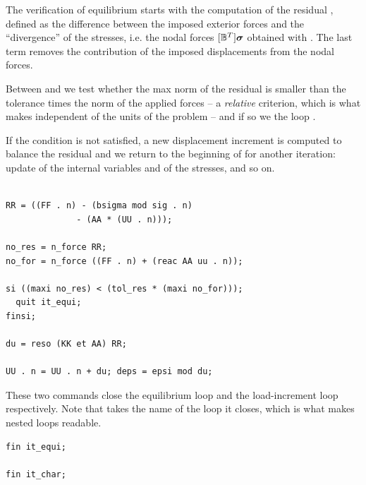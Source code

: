 \begin{castemcom}
The verification of equilibrium starts with the computation of the residual
, defined as the difference between the imposed exterior forces
 and the ``divergence'' of the stresses, i.e. the nodal forces
$[\mathbb{B}^T]\bm{\sigma}$ obtained with . The last term
removes the contribution of the imposed displacements from the nodal forces.

Between  and  we test whether the max norm of the residual
is smaller than the tolerance times the norm of the applied forces -- a
\emph{relative} criterion, which is what makes  independent of
the units of the problem -- and if so we  the loop
.

If the condition is not satisfied, a new displacement increment  is
computed to balance the residual and we return to the beginning of
 for another iteration: update of the internal variables and of
the stresses, and so on.
\end{castemcom}
\begin{castemlines}
\begin{verbatim}

RR = ((FF . n) - (bsigma mod sig . n)
              - (AA * (UU . n)));

no_res = n_force RR;
no_for = n_force ((FF . n) + (reac AA uu . n));

si ((maxi no_res) < (tol_res * (maxi no_for))); 
  quit it_equi;
finsi;

du = reso (KK et AA) RR;

UU . n = UU . n + du; deps = epsi mod du;

\end{verbatim}
\end{castemlines}


\begin{castemcom}
These two commands close the equilibrium loop  and the
load-increment loop  respectively. Note that  takes the
name of the loop it closes, which is what makes nested loops readable.
\end{castemcom}
\begin{castemlines}
\begin{verbatim}
fin it_equi;

fin it_char;
\end{verbatim}
\end{castemlines}

